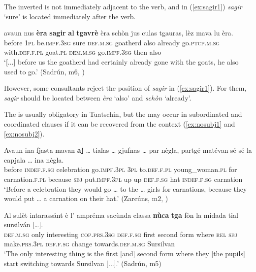 The inverted  is not immediately adjacent to the verb, and in (\ref{ex:sagir1}) \textit{sagir} `sure' is located immediately after the verb.

\ea
\label{ex:sagir1}
	\gll [...] avaun nus \textbf{èra} \textbf{sagir} \textbf{al} \textbf{tgavrè} èra schòn jus culas tgauras, lèz mava lu èra.\\
{} before \textsc{1pl} be.\textsc{impf.3sg} sure \textsc{def.m.sg} goatherd also already go.\textsc{ptcp.m.sg} with.\textsc{def.f.pl} goat.\textsc{pl} \textsc{dem.m.sg} go.\textsc{impf.3sg} then also\\
\glt `[...] before us the goatherd had certainly already gone with the goats, he also used to go.' (Sadrún, m6, )
\z

However, some consultants reject the position of \textit{sagir} in (\ref{ex:sagir1}). For them, \textit{sagir} should be located between \textit{èra} `also' and \textit{schòn} `already'.

The  is usually obligatory in Tuatschin, but the  may occur in subordinated and coordinated clauses if it can be recovered from the context (\ref{ex:nosubj1} and \ref{ex:nosubj2}).

\ea
\label{ex:nosubj1}
\gll    Avaun ina fjasta mavan \textbf{aj} … tialas … gjufnas … par nègla, partgé \longrule  matévan sé sé la capjala … ina nègla.\\
before \textsc{indef.f.sg} celebration go.\textsc{impf.3pl} \textsc{3pl} {} to.\textsc{def.f.pl} {}  young\_woman.\textsc{pl} {} for carnation.\textsc{f.pl} because \textsc{sbj}  put.\textsc{impf.3pl} up up  \textsc{def.f.sg} hat {} \textsc{indef.f.sg} carnation \\
\glt `Before a celebration they would go … to the … girls for carnations, because they would put … a carnation on their hat.' (Zarcúns, m2, )
\z

\ea
\label{ex:nosubj2}
 \gll    Al sulèt intarassánt è l’ ampréma sacùnda classa \textbf{nùca} \textbf{tga} \longrule {} fòn la midada tial sursilván […].\\
 \textsc{def.m.sg} only interesting \textsc{cop.prs.3sg} \textsc{def.f.sg} first second form where \textsc{rel} \textsc{sbj} make.\textsc{prs.3pl} \textsc{def.f.sg} change towards.\textsc{def.m.sg} Sursilvan\\
 \glt `The only interesting thing is the first [and] second form where they [the pupils] start switching towards Sursilvan [...].' (Sadrún, m5)
 \z
 
